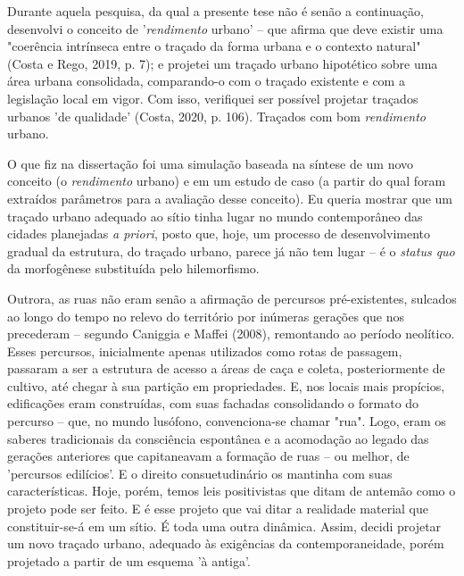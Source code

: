 \documentclass[]{report}
\begin{document}
	Durante aquela pesquisa, da qual a presente tese não é senão a continuação, desenvolvi o conceito de '\textit{rendimento} urbano' – que afirma que deve existir uma "coerência intrínseca entre o traçado da forma urbana e o contexto natural" (Costa e Rego, 2019, p. 7); e projetei um traçado urbano hipotético sobre uma área urbana consolidada, comparando-o com o traçado existente e com a legislação local em vigor. Com isso, verifiquei ser possível projetar traçados urbanos 'de qualidade' (Costa, 2020, p. 106). Traçados com bom \textit{rendimento} urbano. %
	



	O que fiz na dissertação foi uma simulação baseada na síntese de um novo conceito (o \textit{rendimento} urbano) e em um estudo de caso (a partir do qual foram extraídos parâmetros para a avaliação desse conceito). Eu queria mostrar que um traçado urbano
	adequado ao sítio tinha lugar no mundo contemporâneo das cidades planejadas \textit{a priori}, posto que, hoje, um processo de desenvolvimento gradual da estrutura, do traçado urbano, parece já não tem lugar – é o \textit{status quo} da morfogênese substituída pelo hilemorfismo. 
	
	Outrora, as ruas não eram senão a afirmação de percursos pré-existentes, sulcados ao longo do tempo no relevo do território por inúmeras gerações que nos precederam – segundo Caniggia e Maffei (2008), remontando ao período neolítico. Esses percursos, inicialmente apenas utilizados como rotas de passagem, passaram a ser a estrutura de acesso a áreas de caça e coleta, posteriormente de cultivo, até chegar à sua partição em propriedades. E, nos locais mais propícios, edificações eram construídas, com suas fachadas consolidando o formato do percurso – que, no mundo lusófono, convenciona-se chamar "rua". Logo, eram os saberes tradicionais da consciência espontânea e a acomodação ao legado das gerações anteriores que capitaneavam a formação de ruas – ou melhor, de 'percursos edilícios'. E o direito consuetudinário os mantinha com suas características. Hoje, porém, temos leis positivistas que ditam de antemão como o projeto pode ser feito. E é esse projeto que vai ditar a realidade material que constituir-se-á em um sítio. É toda uma outra dinâmica. Assim, decidi projetar um novo traçado urbano, adequado às exigências da contemporaneidade, porém projetado a partir de um esquema 'à antiga'.
\end{document}
